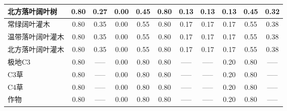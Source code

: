 \begin{landscape}
\begin{table}[htbp]
\begin{tabular}{lcccccccccc}
      北方落叶阔叶树   & 0.80                 & 0.27                 & 0.00                 & 0.45               & 0.80                & 0.13                      & 0.13                    & 0.13                & 0.45              & 0.32                      \\ \hline
      常绿阔叶灌木     & 0.80                 & 0.35                 & 0.00                 & 0.55               & 0.80                & 0.17                      & 0.17                    & 0.17                & 0.55              & 0.38                      \\
      温带落叶阔叶灌木 & 0.80                 & 0.35                 & 0.00                 & 0.55               & 0.80                & 0.17                      & 0.17                    & 0.17                & 0.55              & 0.38                      \\
      北方落叶阔叶灌木 & 0.80                 & 0.35                 & 0.00                 & 0.55               & 0.80                & 0.17                      & 0.17                    & 0.17                & 0.55              & 0.38                      \\ \hline
      极地C3           & 0.80                 & -----                & 0.00                 & 0.80               & 0.80                & -----                     & -----                   & 0.20                & 0.80              & -----                     \\
      C3草             & 0.80                 & -----                & 0.00                 & 0.80               & 0.80                & -----                     & -----                   & 0.20                & 0.80              & -----                     \\
      C4草             & 0.80                 & -----                & 0.00                 & 0.80               & 0.80                & -----                     & -----                   & 0.20                & 0.80              & -----                     \\ \hline
      作物             & 0.80                 & -----                & 0.00                 & 0.80               & 0.80                & -----                     & -----                   & 0.20                & 0.80              & -----                     \\ \bottomrule
    \end{tabular}
  \end{table}
\end{landscape}
